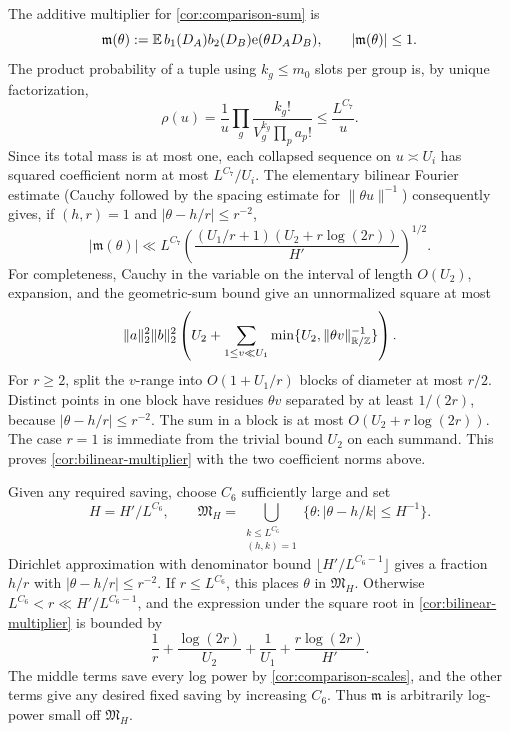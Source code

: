 The additive multiplier for \eqref{cor:comparison-sum} is
\[
 \mathfrak m(\theta)
   :=\mathbb E\,b_1(D_A)b_2(D_B)\mathrm{e}(\theta D_AD_B),
 \qquad |\mathfrak m(\theta)|\leq1.
\]
The product probability of a tuple using $k_g\leq m_0$ slots per
group is, by unique factorization,
\[
 \rho(u)=\frac1u\prod_g
       \frac{k_g!}{V_g^{k_g}\prod_p a_p!}\leq\frac{L^{C_7}}u.
\]
Since its total mass is at most one, each collapsed sequence on
$u\asymp U_i$ has squared coefficient norm at most $L^{C_7}/U_i$.
The elementary bilinear Fourier estimate (Cauchy followed by the
spacing estimate for $\|\theta u\|^{-1}$) consequently gives, if
$(h,r)=1$ and $|\theta-h/r|\leq r^{-2}$,
\begin{equation}\label{cor:bilinear-multiplier}
 |\mathfrak m(\theta)|
  \ll L^{C_7}
    \left(\frac{(U_1/r+1)(U_2+r\log(2r))}{H'}\right)^{1/2}.
\end{equation}
For completeness, Cauchy in the variable on the interval of length
$O(U_2)$, expansion, and the geometric-sum bound give an unnormalized
square at most
\[
 \|a\|_2^2\|b\|_2^2
 \left(U_2+\sum_{1\leq v\ll U_1}
                   \min\{U_2,\|\theta v\|_{\mathbb R/\mathbb Z}^{-1}\}\right).
\]
For $r\geq2$, split the $v$-range into $O(1+U_1/r)$ blocks of
diameter at most $r/2$.  Distinct points in one block have residues
$\theta v$ separated by at least $1/(2r)$, because
$|\theta-h/r|\leq r^{-2}$.  The sum in a block is at most
$O(U_2+r\log(2r))$.  The case $r=1$ is immediate from the trivial
bound $U_2$ on each summand.  This proves
\eqref{cor:bilinear-multiplier} with the two coefficient norms above.

Given any required saving, choose $C_6$ sufficiently large and set
\begin{equation}\label{cor:major-arcs}
 H=H'/L^{C_6},\qquad
 \mathfrak M_H=\bigcup_{\substack{k\leq L^{C_6}\\(h,k)=1}}
         \{\theta:|\theta-h/k|\leq H^{-1}\}.
\end{equation}
Dirichlet approximation with denominator bound
$\lfloor H'/L^{C_6-1}\rfloor$ gives a fraction $h/r$ with
$|\theta-h/r|\leq r^{-2}$.  If $r\leq L^{C_6}$, this places
$\theta$ in $\mathfrak M_H$.  Otherwise
$L^{C_6}<r\ll H'/L^{C_6-1}$, and the expression under the square
root in \eqref{cor:bilinear-multiplier} is bounded by
\[
 \frac1r+\frac{\log(2r)}{U_2}
       +\frac1{U_1}+\frac{r\log(2r)}{H'}.
\]
The middle terms save every log power by
\eqref{cor:comparison-scales}, and the other terms give any desired
fixed saving by increasing $C_6$.  Thus $\mathfrak m$ is arbitrarily
log-power small off $\mathfrak M_H$.

